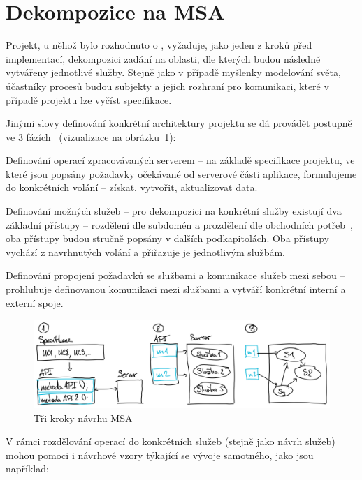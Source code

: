 \section{Dekompozice na MSA}\label{sec:msa-decomposition}

Projekt, u něhož bylo rozhodnuto o , vyžaduje, jako jeden z kroků před implementací, dekompozici zadání na oblasti, dle kterých budou následně vytvářeny jednotlivé služby.
Stejně jako v případě myšlenky modelování světa, účastníky procesů budou subjekty a jejich rozhraní pro komunikaci, které v případě projektu lze vyčíst specifikace.

Jinými slovy definování konkrétní architektury projektu se dá provádět postupně ve 3 fázích~\cite{msachris} (vizualizace na obrázku~\ref{fig:msa-decomposition-flow}):


\begin{ol}
   \item Definování operací zpracovávaných serverem – na základě specifikace projektu, ve které jsou popsány požadavky očekávané od serverové části aplikace, formulujeme do konkrétních volání – získat, vytvořit, aktualizovat data.
   \item Definování možných služeb – pro dekompozici na konkrétní služby existují dva základní přístupy – rozdělení dle subdomén a prozdělení dle obchodních potřeb~\cite{msachris}, oba přístupy budou stručně popsány v dalších podkapitolách.
   Oba přístupy vychází z navrhnutých volání a přiřazuje je jednotlivým službám.
   \item Definování propojení požadavků se službami a komunikace služeb mezi sebou – prohlubuje definovanou komunikaci mezi službami a vytváří konkrétní interní a externí spoje.
\end{ol}


\begin{figure}[htbp]
   \centering
   \includegraphics[max width=\textwidth]{assets/draft-decomposition-flow}
   \caption{Tři kroky návrhu MSA}\label{fig:msa-decomposition-flow}
\end{figure}


V rámci rozdělování operací do konkrétních služeb (stejně jako návrh služeb) mohou pomoci i návrhové vzory týkající se vývoje samotného, jako jsou například:


